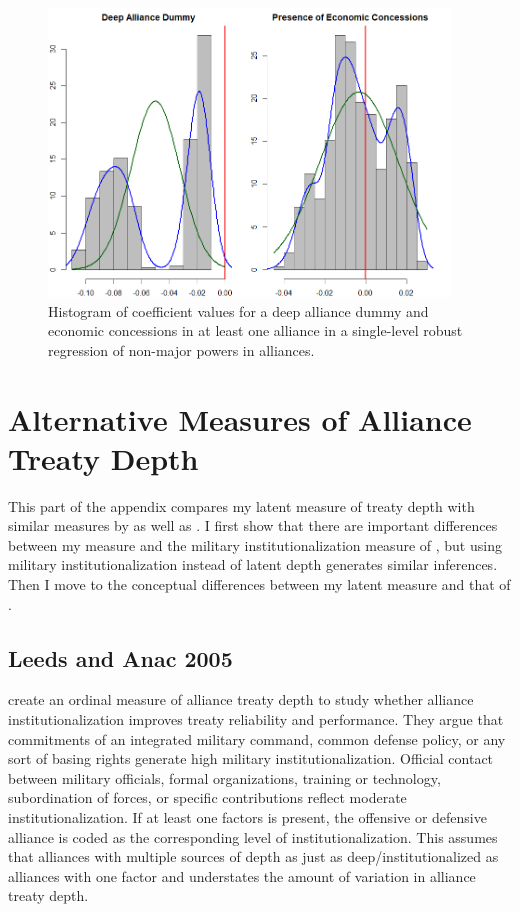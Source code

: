 \documentclass[12pt]{article}
\begin{document}
\begin{figure}[htbp]
	\centering
		\includegraphics[width=0.95\textwidth]{eba-single-level.png}
	\caption{Histogram of coefficient values for a deep alliance dummy and economic concessions in at least one alliance in a single-level robust regression of non-major powers in alliances.}
	\label{fig:eba-single-level}
\end{figure}




\section{Alternative Measures of Alliance Treaty Depth}

This part of the appendix compares my latent measure of treaty depth with similar measures by \citet{LeedsAnac2005} as well as \citet{BensonClinton2016}. 
I first show that there are important differences between my measure and the military institutionalization measure of \citet{LeedsAnac2005}, but using military institutionalization instead of latent depth generates similar inferences. 
Then I move to the conceptual differences between my latent measure and that of \citet{BensonClinton2016}.


\subsection{Leeds and Anac 2005}


\citet{LeedsAnac2005} create an ordinal measure of alliance treaty depth to study whether alliance institutionalization improves treaty reliability and performance. 
They argue that commitments of an integrated military command, common defense policy, or any sort of basing rights generate high military institutionalization. 
Official contact between military officials, formal organizations, training or technology, subordination of forces, or specific contributions reflect moderate institutionalization. 
If at least one factors is present, the offensive or defensive alliance is coded as the corresponding level of institutionalization. 
This assumes that alliances with multiple sources of depth as just as deep/institutionalized as alliances with one factor and understates the amount of variation in alliance treaty depth. 
\end{document}
